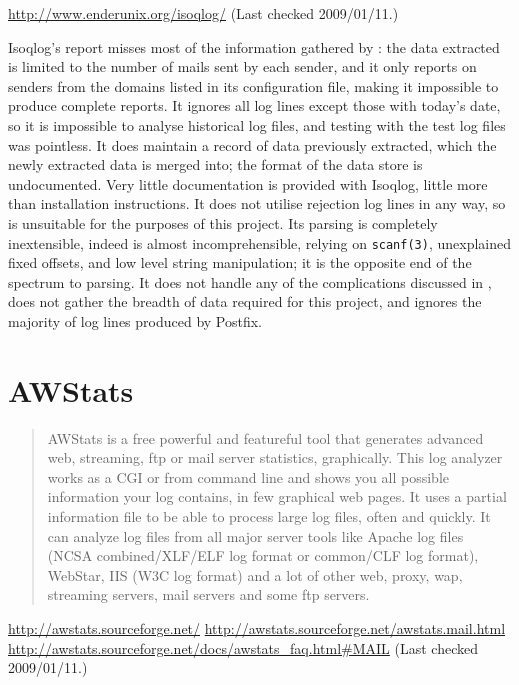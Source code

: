 \noindent{}\url{http://www.enderunix.org/isoqlog/} \newline{}
(Last checked 2009/01/11.)

Isoqlog's report misses most of the information gathered by \parsername{}:
the data extracted is limited to the number of mails sent by each sender,
and it only reports on senders from the domains listed in its configuration
file, making it impossible to produce complete reports.  It ignores all log
lines except those with today's date, so it is impossible to analyse
historical log files, and testing with the \numberOFlogFILES{} test log
files was pointless.  It does maintain a record of data previously
extracted, which the newly extracted data is merged into; the format of the
data store is undocumented.  Very little documentation is provided with
Isoqlog, little more than installation instructions.  It does not utilise
rejection log lines in any way, so is unsuitable for the purposes of this
project.  Its parsing is completely inextensible, indeed is almost
incomprehensible, relying on \texttt{scanf(3)}, unexplained fixed offsets,
and low level string manipulation; it is the opposite end of the spectrum
to \parsernames{} parsing.  It does not handle any of the complications
discussed in , does not gather the breadth of
data required for this project, and ignores the majority of log lines
produced by Postfix.

\section{AWStats}

\begin{quotation}

    AWStats is a free powerful and featureful tool that generates advanced
    web, streaming, ftp or mail server statistics, graphically. This log
    analyzer works as a CGI or from command line and shows you all possible
    information your log contains, in few graphical web pages. It uses a
    partial information file to be able to process large log files, often
    and quickly. It can analyze log files from all major server tools like
    Apache log files (NCSA combined/XLF/ELF log format or common/CLF log
    format), WebStar, IIS (W3C log format) and a lot of other web, proxy,
    wap, streaming servers, mail servers and some ftp servers.

\end{quotation}

\noindent{}\url{http://awstats.sourceforge.net/} \newline{}
\url{http://awstats.sourceforge.net/awstats.mail.html} \newline{}
\url{http://awstats.sourceforge.net/docs/awstats_faq.html#MAIL} \newline{}
(Last checked 2009/01/11.)

